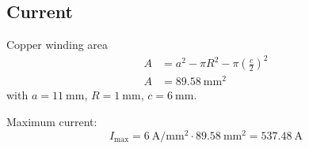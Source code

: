 \documentclass[10pt,a4paper,noendnumber=true]{scrartcl}
\begin{document}
\subsection{Current}
Copper winding area
\begin{align}
A &= a^2-\pi R^2 - \pi \left(\frac{c}{2}\right)^2\\
A &= \SI{89.58}{\mm\squared}
\end{align}
with $a=\SI{11}{\mm}$, $R=\SI{1}{\mm}$, $c=\SI{6}{\mm}$.

Maximum current:
\begin{equation}
I_\text{max} = \SI{6}{\ampere\per\mm\squared} \cdot \SI{89.58}{\mm\squared} = \SI{537.48}{\ampere}
\end{equation}
\end{document}
